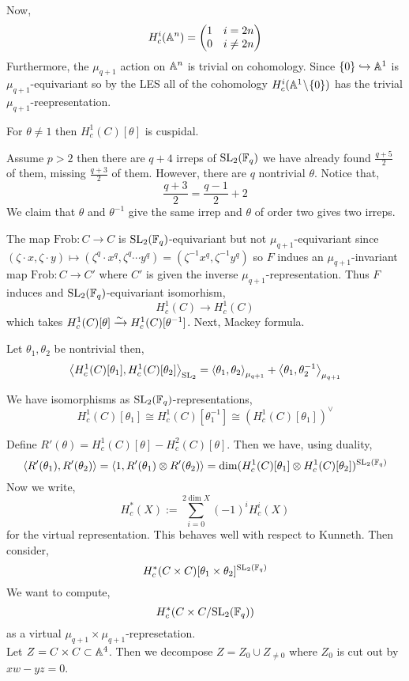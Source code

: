 \documentclass[12pt]{article}
\newcommand{\Frob}{\mathrm{Frob}}
\begin{document}
Now,
\[ H^i_c(\mathbb{A}^n) = 
\begin{pmatrix}
1 & i = 2n
\\
0 & i \neq 2n
\end{pmatrix} \]
Furthermore, the $\mu_{q+1}$ action on $\mathbb{A}^n$ is trivial on cohomology. Since $\{ 0 \} \hookrightarrow \mathbb{A}^1$ is $\mu_{q+1}$-equivariant so by the LES all of the cohomology $H^i_c(\mathbb{A}^1 \! \setminus \! \{ 0 \})$ has the trivial $\mu_{q+1}$-reepresentation. 

\begin{cor}
For $\theta \neq 1$ then $H^1_c(C) [\theta]$ is cuspidal.
\end{cor}

\begin{rmk}
Assume $p > 2$ then there are $q+4$ irreps of $\mathrm{SL}_2(\mathbb{F}_q)$ we have already found $\frac{q+5}{2}$ of them, missing $\frac{q+3}{2}$ of them. However, there are $q$ nontrivial $\theta$. Notice that,
\[ \frac{q+3}{2} = \frac{q-1}{2} + 2 \]
We claim that $\theta$ and $\theta^{-1}$ give the same irrep and $\theta$ of order two gives two irreps. 
\end{rmk}

\begin{rmk}
The map $\Frob : C \to C$ is $\mathrm{SL}_2(\mathbb{F}_q)$-equivariant but not $\mu_{q+1}$-equivariant since $(\zeta \cdot x, \zeta \cdot y) \mapsto (\zeta^{q} \cdot x^q, \zeta^{q} \cdots y^q) = (\zeta^{-1} x^q, \zeta^{-1} y^q)$ so $F$ indues an $\mu_{q+1}$-invariant map $\Frob : C \to C'$ where $C'$ is given the inverse $\mu_{q+1}$-representation. Thus $F$ induces and $\mathrm{SL}_2(\mathbb{F}_q)$-equivariant isomorhism,
\[ H^1_c(C) \to H^1_c(C) \]
which takes $H^1_c(C)[\theta] \xrightarrow{\sim} H^1_c(C)[\theta^{-1}]$. Next, Mackey formula. 
\end{rmk}

\begin{theorem}
Let $\theta_1, \theta_2$ be nontrivial then,
\[ \left< H^1_c(C)[\theta_1], H^1_c(C)[\theta_2] \right>_{\mathrm{SL}_2} = \left< \theta_1, \theta_2 \right>_{\mu_{q+1}} + \left< \theta_1, \theta_2^{-1} \right>_{\mu_{q+1}} \]
\end{theorem}

\begin{prop}
We have isomorphisms as $\mathrm{SL}_2(\mathbb{F}_q)$-representations,
\[ H^1_c(C)[\theta_1] \cong H^1_c(C) [\theta_1^{-1}] \cong (H^1_c(C)[\theta_1])^\vee \]
\end{prop}

Define $R'(\theta) = H_c^1(C)[\theta] - H^2_c(C)[\theta]$. Then we have, using duality,
\[ \left< R'(\theta_1), R'(\theta_2) \right> = \left< 1, R'(\theta_1) \otimes R'(\theta_2) \right> = \dim (H^1_c(C)[\theta_1] \otimes H^1_c(C)[\theta_2])^{\mathrm{SL}_2(\mathbb{F}_q)} \]
Now we write,
\[ H^*_c(X) := \sum_{i = 0}^{2 \dim{X}} (-1)^i H^i_c(X) \]
for the virtual representation. This behaves well with respect to Kunneth. Then consider,
\[ H^*_c(C \times C)[\theta_1 \times \theta_2]^{\mathrm{SL}_2(\mathbb{F}_q)} \] 
We want to compute,
\[ H^*_c(C \times C / \mathrm{SL}_2(\mathbb{F}_q)) \]
as a virtual $\mu_{q+1} \times \mu_{q+1}$-represetation. 
\bigskip\\
Let $Z = C \times C \subset \mathbb{A}^4$. Then we decompose $Z = Z_0 \cup Z_{\neq 0}$ where $Z_0$ is cut out by $xw - yz = 0$. 
\end{document}
